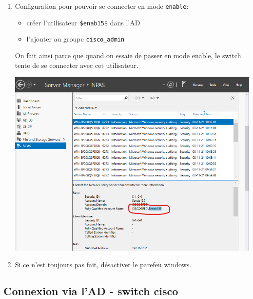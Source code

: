 \documentclass[a4paper]{article}
\begin{document}
\begin{enumerate}
\item Configuration pour pouvoir se connecter en mode \texttt{enable}:
\begin{itemize}
    \item créer l'utilisateur \texttt{\$enab15\$} dans l'AD
    \item l'ajouter au groupe \texttt{cisco\_admin}
\end{itemize}
On fait ainsi parce que quand on essaie de passer en mode enable, le switch tente de se connecter avec cet utilisateur.
\begin{center} \includegraphics[width=0.85\linewidth]{images/logs-enab15.png} \end{center}

\item Si ce n'est toujours pas fait, désactiver le parefeu windows.

\end{enumerate}










\subsection{Connexion via l'AD - switch cisco}
\end{document}
